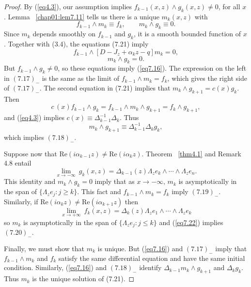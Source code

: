 \documentclass{surv-l}
\theoremstyle{plain}
\theoremstyle{definition}
\numberwithin{equation}{chapter}
\begin{document}
\begin{proof}
By (\ref{eq4.3}), our assumption implies $f_{k-1}(x, z)\wedge g_{k}(x, z)\neq 0$, for all $x$. Lemma ~\ref{chap01:lem7.11} tells us there is a unique $m_{k}(x, z)$ with
\setcounter{equation}{20}
\begin{equation}
f_{k-1}\wedge m_{k}\equiv f_{k},\qquad m_{k}\wedge g_{k}\equiv 0.
\end{equation}
Since $m_{k}$ depends smoothly on $f_{k-1}$ and $g_{k}$, it is a smooth bounded function of $x$. Together with (3.4), the equations (7.21) imply
\begin{equation*}
f_{k-1}\wedge[D-J_{z}+\alpha_{k}z-q]m_{k}=0,
\end{equation*}
\begin{equation*}
[D-J_{z}+\alpha_{k}z-q]m_{k}\wedge g_{k}=0.
\end{equation*}
But $f_{k-1}\wedge g_{k}\neq 0$, so these equations imply (\ref{eq7.16}). The expression on the left in $(7.17)_{-}$ is the same as the limit of $f_{k-1}\wedge m_{k}=f_{k}$, which gives the right side of $(7.17)_{-}$. The second equation in (7.21) implies that $m_{k}\wedge g_{k+1}=c(x)g_{k}$. Then
\begin{equation*}
c\,(x)f_{k-1}\wedge g_{k}=f_{k-1}\wedge m_{k}\wedge g_{k+1}=f_{k}\wedge g_{k+1},
\end{equation*}
and (\ref{eq4.3}) implies $c(x)\equiv\Delta_{k-1}^{-1}\Delta_{k}$. Thus
\begin{equation}\label{eq7.22}
m_{k}\wedge g_{k+1}\equiv\Delta_{k-1}^{-1}\Delta_{k}g_{k},
\end{equation}
which implies $(7.18)_{-}$.

Suppose now that $\mathrm{Re}(i\alpha_{k-1}z)\neq\mathrm{Re}(i\alpha_{k}z)$. Theorem ~\ref{thm4.1} and Remark 4.8 entail
\begin{equation*}
\lim_{x\rightarrow-\infty}\  g_{k}(x, z)=\Delta_{k-1}(z)\Lambda_{z}e_{k}\wedge\cdots\wedge\Lambda_{z}e_{n}.
\end{equation*}
This identity and $m_{k}\wedge g_{k}=0$ imply that as $ x\rightarrow-\infty,\, m_{k}$ is asymptotically in the span of $\{\Lambda_{z}e_{j}:j\geq k\}$. This fact and $f_{k-1}\wedge m_{k}=f_{k}$ imply $(7.19)_{-}$. Similarly, if $\mathrm{Re}(i\alpha_{k}z)\neq\mathrm{Re}(i\alpha_{k+1}z)$ then
\begin{equation*}
\lim_{x\rightarrow+\infty}\  f_{k}(x, z)=\Delta_{k}(z)\Lambda_{z}e_{1}\wedge\cdots\wedge\Lambda_{z}e_{k}
\end{equation*}
so $m_{k}$ is asymptotically in the span of $\{\Lambda_{z}e_{j}:j\leq k\}$ and (\ref{eq7.22}) implies $(7.20)_{-}$.

Finally, we must show that $m_{k}$ is unique. But (\ref{eq7.16}) and $(7.17)_{-}$ imply that $f_{k-1}\wedge m_{k}$ and $f_{k}$ satisfy the same differential equation and have the same initial condition. Similarly, (\ref{eq7.16}) and $(7.18)_{-}$ identify $\Delta_{k-1}m_{k}\wedge g_{k+1}$ and $\Delta_{k}g_{k}$. Thus $m_{k}$ is the unique solution of (7.21).
\end{proof}
\end{document}
